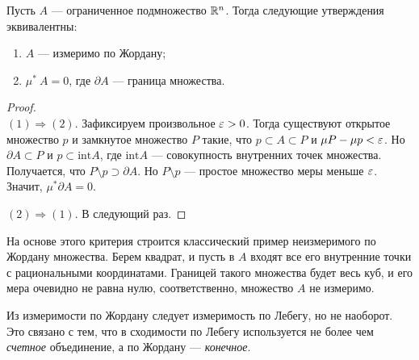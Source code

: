 \begin{Statement}
Пусть $A$ --- ограниченное подмножество $\mathbb{R}^n$. Тогда следующие утверждения эквивалентны:
\begin{enumerate}
\item $A$ --- измеримо по Жордану;
\item $\mu^* \ A = 0$, где $\partial
 A$ --- граница множества.
\end{enumerate}
\end{Statement}
\begin{proof}\ \\
$(1) \Rightarrow (2)$. Зафиксируем произвольное $\varepsilon > 0$. Тогда существуют открытое множество $p$ и замкнутое множество $P$ такие, что $p \subset A \subset P$ и $\mu P- \mu p < \varepsilon$. Но $\partial
 A \subset P$ и $p \subset \mathrm{int} A$, где $\mathrm{int} A$ --- совокупность внутренних точек множества. Получается, что $P \setminus p \supset \partial
 A$. Но $P \setminus p$ --- простое множество меры меньше $\varepsilon$. Значит, $\mu^* \partial
 A = 0$.

$(2) \Rightarrow (1)$. В следующий раз.
\end{proof}

\begin{Comment}
На основе этого критерия строится классический пример неизмеримого по Жордану множества. Берем квадрат, и пусть в $A$ входят все его внутренние точки с рациональными координатами. Границей такого множества будет весь куб, и его мера очевидно не равна нулю, соответственно, множество $A$ не измеримо.
\end{Comment}
\begin{Comment}
Из измеримости по Жордану следует измеримость по Лебегу, но не наоборот. Это связано с тем, что в сходимости по Лебегу используется не более чем \textit{счетное} объединение, а по Жордану --- \textit{конечное}.
\end{Comment}